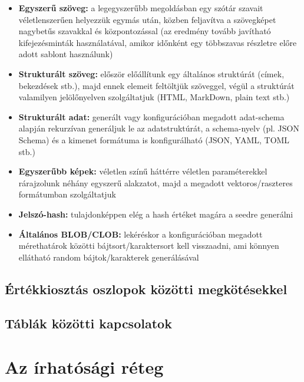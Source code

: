 \documentclass[
    parspace, %
    noindent, %
]{elteiktdk}[2023/04/10]
\begin{document}
\begin{itemize}
  \item \textbf{Egyszerű szöveg:}
    a legegyszerűbb megoldásban egy szótár szavait véletlenszerűen helyezzük egymás után,
    közben feljavítva a szövegképet nagybetűs szavakkal és központozással
    (az eredmény tovább javítható kifejezésminták használatával,
    amikor időnként egy többszavas részletre előre adott sablont használunk)
  \item \textbf{Strukturált szöveg:}
    először előállítunk egy általános struktúrát (címek, bekezdések stb.),
    majd ennek elemeit feltöltjük szöveggel,
    végül a struktúrát valamilyen jelölőnyelven szolgáltatjuk (HTML, MarkDown, plain text stb.)
  \item \textbf{Strukturált adat:}
    generált vagy konfigurációban megadott adat-schema alapján rekurzívan generáljuk le az adatstruktúrát,
    a schema-nyelv (pl. JSON Schema) és a kimenet formátuma is konfigurálható (JSON, YAML, TOML stb.)
  \item \textbf{Egyszerűbb képek:}
    véletlen színű háttérre véletlen paraméterekkel
    rárajzolunk néhány egyszerű alakzatot,
    majd a megadott vektoros/raszteres formátumban szolgáltatjuk
  \item \textbf{Jelszó-hash:}
    tulajdonképpen elég a hash értéket magára a seedre generálni
  \item \textbf{Általános BLOB/CLOB:}
    lekéréskor a konfigurációban megadott mérethatárok közötti bájtsort/karaktersort kell visszaadni,
    ami könnyen ellátható random bájtok/karakterek generálásával
\end{itemize}

\subsection{Értékkiosztás oszlopok közötti megkötésekkel}


\subsection{Táblák közötti kapcsolatok}


\section{Az írhatósági réteg}
\end{document}
